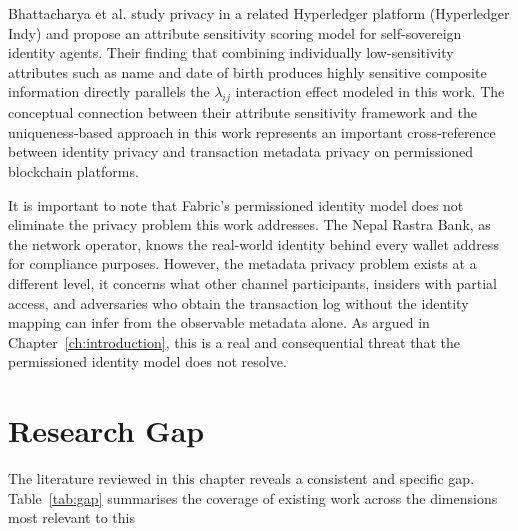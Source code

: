 Bhattacharya et al. \cite{bhattacharya2020} study
privacy in a related Hyperledger platform (Hyperledger Indy)
and propose an attribute sensitivity scoring model for
self-sovereign identity agents. Their finding that combining
individually low-sensitivity attributes such as name and
date of birth produces highly sensitive composite
information directly parallels the $\lambda_{ij}$
interaction effect modeled in this work. The conceptual
connection between their attribute sensitivity framework
and the uniqueness-based approach in this work represents
an important cross-reference between identity privacy and
transaction metadata privacy on permissioned blockchain
platforms.

It is important to note that Fabric's permissioned identity
model does not eliminate the privacy problem this work
addresses. The Nepal Rastra Bank, as the network operator,
knows the real-world identity behind every wallet address
for compliance purposes. However, the metadata privacy
problem exists at a different level, it concerns what other
channel participants, insiders with partial access, and
adversaries who obtain the transaction log without the
identity mapping can infer from the observable metadata
alone. As argued in Chapter~\ref{ch:introduction}, this
is a real and consequential threat that the permissioned
identity model does not resolve.

\section{Research Gap}
\label{sec:research_gap}

The literature reviewed in this chapter reveals a consistent
and specific gap. Table~\ref{tab:gap} summarises the coverage
of existing work across the dimensions most relevant to this


